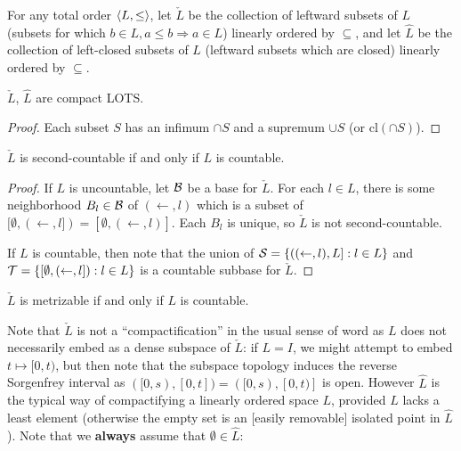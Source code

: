 \documentclass[11pt]{article}
\renewcommand{\cl}{\textrm{cl}}
\begin{document}
  \begin{definition}
    For any total order \(\langle L,\leq\rangle\), let \(\check L\) be the collection of
    leftward subsets of \(L\)
    (subsets for which \(b\in L,a\leq b\Rightarrow a\in L\))
    linearly ordered by \(\subseteq\), and let \(\hat L\) be the collection
    of left-closed subsets of \(L\) (leftward subsets which are closed)
    linearly ordered by \(\subseteq\).
  \end{definition}

  \begin{proposition}
    \(\check L\), \(\hat L\) are compact LOTS.
  \end{proposition}

  \begin{proof}
    Each subset \(S\) has an infimum \(\cap S\) and a supremum \(\cup S\)
    (or \(\cl(\cap S)\)).
  \end{proof}

  \begin{theorem}
    \(\check L\) is second-countable if and only if \(L\) is countable.
  \end{theorem}

  \begin{proof}
    If \(L\) is uncountable, let \(\mathcal{B}\) be a base for \(\check L\).
    For each \(l\in L\), there is some neighborhood \(B_l\in\mathcal{B}\) of
    \((\leftarrow,l)\) which is a subset of
    \([\emptyset,(\leftarrow,l])=[\emptyset,(\leftarrow,l)]\). Each \(B_l\)
    is unique, so \(\check L\) is not second-countable.

    If \(L\) is countable, then note that the union of
    \(\mathcal{S}=\{((\leftarrow,l),L]:l\in L\}\) and
    \(\mathcal{T}=\{[\emptyset,(\leftarrow,l]):l\in L\}\)
    is a countable subbase for \(\check L\).
  \end{proof}

  \begin{corollary}
    \(\check L\) is metrizable if and only if \(L\) is countable.
  \end{corollary}

  Note that \(\check L\)
  is not a ``compactification'' in the usual sense of word
  as \(L\) does not necessarily
  embed as a dense subspace of \(\check L\): if \(L=I\), we might attempt to embed
  \(t\mapsto [0,t)\), but then note that the subspace topology induces the
  reverse Sorgenfrey interval as \(([0,s),[0,t])=([0,s),[0,t)]\) is open.
  However \(\hat L\) is
  the typical way of compactifying a linearly ordered space \(L\),
  provided \(L\) lacks a least element (otherwise the empty set is an [easily
  removable] isolated point in \(\hat L\)). Note that we \textbf{always}
  assume that \(\emptyset\in\hat L\):
\end{document}
